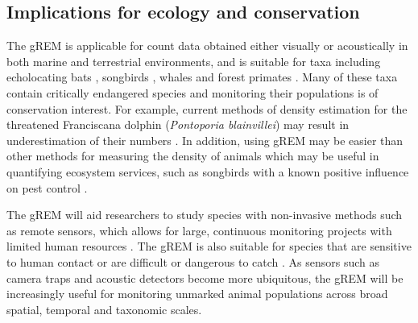 \subsection{Implications for ecology and conservation}

The gREM is applicable for count data obtained either visually or acoustically in both marine and terrestrial environments, and is suitable for taxa including echolocating bats \cite{walters2012continental}, songbirds \cite{buckland2006point}, whales \cite{marques2011estimating} and forest primates \cite{hassel2008reliable}.
Many of these taxa contain critically endangered species and monitoring their populations is of conservation interest.
For example, current methods of density estimation for the threatened Franciscana dolphin (\emph{Pontoporia blainvillei}) may result in underestimation of their numbers \cite{crespo2010abundance}.
In addition, using gREM may be easier than other methods for measuring the density of animals which may be useful in quantifying ecosystem services, such as songbirds with a known positive influence on pest control \cite{jirinec2011roosting}.

The gREM will aid researchers to study species with non-invasive methods such as remote sensors, which allows for large, continuous monitoring projects with limited human resources \cite{kelly2012noninvasive}.
The gREM is also suitable  for species that are sensitive to human contact or are difficult or dangerous to catch \cite{thomas2012passive}.
As sensors such as camera traps and acoustic detectors become more ubiquitous, the gREM will be increasingly useful for monitoring unmarked animal populations across broad spatial, temporal and taxonomic scales.






